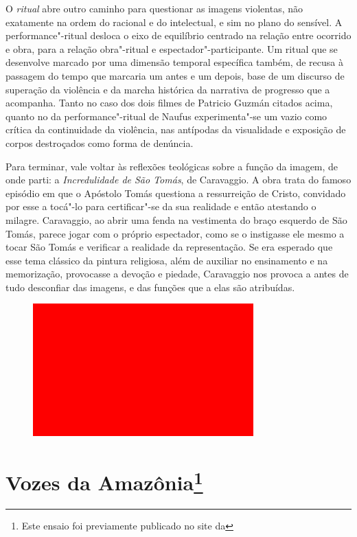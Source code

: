 O \emph{ritual} abre outro caminho para questionar as imagens violentas,
não exatamente na ordem do racional e do intelectual, e sim no plano do
sensível. A performance"-ritual desloca o eixo de equilíbrio centrado na
relação entre ocorrido e obra, para a relação obra"-ritual e
espectador"-participante. Um ritual que se desenvolve marcado por uma
dimensão temporal específica também, de recusa à passagem do tempo que
marcaria um antes e um depois, base de um discurso de superação da
violência e da marcha histórica da narrativa de progresso que a
acompanha. Tanto no caso dos dois filmes de Patricio Guzmán citados
acima, quanto no da performance"-ritual de Naufus experimenta"-se um vazio
como crítica da continuidade da violência, nas antípodas da visualidade
e exposição de corpos destroçados como forma de denúncia.

\asterisc

Para terminar, vale voltar às reflexões teológicas sobre a função da
imagem, de onde parti: a \emph{Incredulidade de São Tomás}, de
Caravaggio. A obra trata do famoso episódio em que o Apóstolo Tomás
questiona a ressurreição de Cristo, convidado por esse a tocá"-lo para
certificar"-se da sua realidade e então atestando o milagre. Caravaggio,
ao abrir uma fenda na vestimenta do braço esquerdo de São Tomás, parece
jogar com o próprio espectador, como se o instigasse ele mesmo a tocar São
Tomás e verificar a realidade da representação. Se era esperado que esse
tema clássico da pintura religiosa, além de auxiliar no ensinamento e na
memorização, provocasse a devoção e piedade, Caravaggio nos provoca a
antes de tudo desconfiar das imagens, e das funções que a elas são
atribuídas.

\begin{figure}[!ht]
\centering
 \includegraphics[width=85mm]{./imgs/im1.jpg}
\caption{\footnotesize{}}
\end{figure}

\chapter{Vozes da Amazônia\protect\footnote{Este ensaio foi %
  previamente publicado no site da {}}}

